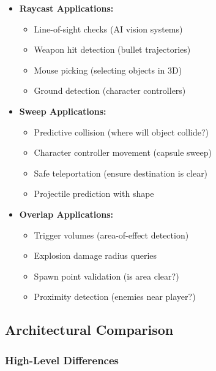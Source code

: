 \begin{itemize}
    \item \textbf{Raycast Applications:}
    \begin{itemize}
        \item Line-of-sight checks (AI vision systems)
        \item Weapon hit detection (bullet trajectories)
        \item Mouse picking (selecting objects in 3D)
        \item Ground detection (character controllers)
    \end{itemize}

    \item \textbf{Sweep Applications:}
    \begin{itemize}
        \item Predictive collision (where will object collide?)
        \item Character controller movement (capsule sweep)
        \item Safe teleportation (ensure destination is clear)
        \item Projectile prediction with shape
    \end{itemize}

    \item \textbf{Overlap Applications:}
    \begin{itemize}
        \item Trigger volumes (area-of-effect detection)
        \item Explosion damage radius queries
        \item Spawn point validation (is area clear?)
        \item Proximity detection (enemies near player?)
    \end{itemize}
\end{itemize}


\subsection{Architectural Comparison}

\subsubsection{High-Level Differences}

